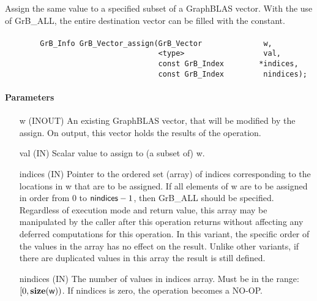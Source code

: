 Assign the same value to a specified subset of a GraphBLAS vector.  With the use of {\sf GrB\_ALL}, the 
entire destination vector can be filled with the constant.

\paragraph{\syntax}

\begin{verbatim}
        GrB_Info GrB_Vector_assign(GrB_Vector              w,
                                   <type>                  val,
                                   const GrB_Index        *indices,
                                   const GrB_Index         nindices);
\end{verbatim}

\paragraph{Parameters}

\begin{itemize}[leftmargin=1.1in]
    \item[{\sf w}] ({\sf INOUT}) An existing GraphBLAS vector, that will
    be modified by the assign.  On output, this vector holds the results
    of the operation.

    \item[{\sf val}] ({\sf IN}) Scalar value to assign to (a subset of)
    {\sf w}.

    \item[{\sf indices}]  ({\sf IN}) Pointer to the ordered set (array)
    of indices corresponding to the locations in {\sf w} that are to
    be assigned.  If all elements of {\sf w} are to be assigned in
    order from $0$ to ${\sf nindices} - 1$, then {\sf GrB\_ALL} should
    be specified.  Regardless of execution mode and return value, this
    array may be manipulated by the caller after this operation returns
    without affecting any deferred computations for this operation.
    In this variant, the specific order of the values in the array has no
    effect on the result.  Unlike other variants, if there are duplicated
    values in this array the result is still defined.

    \item[{\sf nindices}] ({\sf IN}) The number of values in {\sf
    indices} array.  Must be in the range: $[0, \bold{size}({\sf w}))$.
    If {\sf nindices} is zero, the operation becomes a NO-OP.
\end{itemize}

